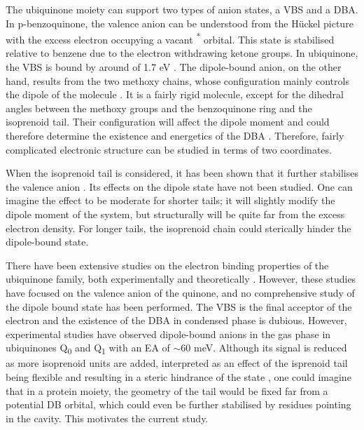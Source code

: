 The ubiquinone moiety can support two types of anion states, a VBS and a DBA. In p-benzoquinone, the valence anion can be understood from the H{\"u}ckel picture with the excess electron occupying a vacant \textpi \textsuperscript{*} orbital. This state is stabilised relative to benzene due to the electron withdrawing ketone groups. In ubiquinone, the VBS is bound by around of 1.7 eV \cite{chen2024low}. The dipole-bound anion, on the other hand, results from the two methoxy chains, whose configuration mainly controls the dipole of the molecule \cite{ameixa2023parent}. It is a fairly rigid molecule, except for the dihedral angles between the methoxy groups and the benzoquinone ring and the isoprenoid tail. Their configuration will affect the dipole moment and could therefore determine the existence and energetics of the DBA \cite{ameixa2023parent,bull2015anion}. Therefore, fairly complicated electronic structure can be studied in terms of two coordinates. 

When the isoprenoid tail is considered, it has been shown that it further stabilises the valence anion \cite{pshenichnyuk2020ionizing}. Its effects on the dipole state have not been studied. One can imagine the effect to be moderate for shorter tails; it will slightly modify the dipole moment of the system, but structurally will be quite far from the excess electron density. For longer tails, the isoprenoid chain could sterically hinder the dipole-bound state.

There have been extensive studies on the electron binding properties of the ubiquinone family, both experimentally \cite{ameixa2023parent,west2014anion,pshenichnyuk2020ionizing,bull2015anion} and theoretically \cite{ameixa2023parent,pshenichnyuk2020ionizing,haldar2020multilayer, nonella1998quantum, gamiz2017terminal}. However, these studies have focused on the valence anion of the quinone, and no comprehensive study of the dipole bound state has been performed. The VBS is the final acceptor of the electron and the existence of the DBA in condensed phase is dubious.
However, experimental studies have observed dipole-bound anions in the gas phase in ubiquinones Q\textsubscript{0} and Q\textsubscript{1} with an EA of $\mathrm{\sim}$60 meV\cite{ameixa2023parent}. Although its signal is reduced as more isoprenoid units are added, interpreted as an effect of the isprenoid tail being flexible and resulting in a steric hindrance of the state \cite{ameixa2023parent,pshenichnyuk2020ionizing}, one could imagine that in a protein moiety, the geometry of the tail would be fixed far from a potential DB orbital, which could even be further stabilised by residues pointing in the cavity. This motivates the current study.

